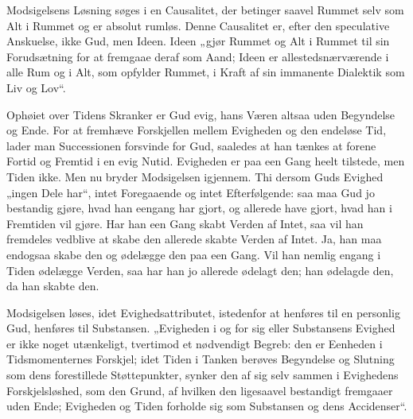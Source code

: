 \documentclass[12pt]{book}
\begin{document}
Modsigelsens Løsning søges i en Causalitet, der betinger saavel
Rummet selv som Alt i Rummet og er absolut rumløs. Denne Causalitet
er, efter den speculative Anskuelse, ikke Gud, men Ideen. Ideen
„gjør Rummet og Alt i Rummet til sin Forudsætning for at fremgaae
deraf som Aand; Ideen er allestedsnærværende i alle Rum og i Alt,
som opfylder Rummet, i Kraft af sin immanente Dialektik som Liv og
Lov“.

Ophøiet over Tidens Skranker er Gud evig, hans Væren altsaa uden
Begyndelse og Ende. For at fremhæve Forskjellen mellem Evigheden og
den endeløse Tid, lader man Successionen forsvinde for Gud,
saaledes at han tænkes at forene Fortid og Fremtid i en evig Nutid.
Evigheden er paa een Gang heelt tilstede, men
Tiden ikke. Men nu bryder Modsigelsen igjennem. Thi dersom Guds
Evighed „ingen Dele har“, intet Foregaaende og intet Efterfølgende:
saa maa Gud jo bestandig gjøre, hvad han eengang har gjort, og
allerede have gjort, hvad han i Fremtiden vil gjøre. Har han een
Gang skabt Verden af Intet, saa vil han fremdeles vedblive at skabe
den allerede skabte Verden af Intet. Ja, han maa endogsaa skabe den
og ødelægge den paa een Gang. Vil han nemlig engang i Tiden
ødelægge Verden, saa har han jo allerede ødelagt den; han ødelagde
den, da han skabte den.

Modsigelsen løses, idet Evighedsattributet, istedenfor at henføres
til en personlig Gud, henføres til Substansen. „Evigheden i og for
sig eller Substansens Evighed er ikke noget utænkeligt, tvertimod et
nødvendigt Begreb: den er Eenheden i Tidsmomenternes Forskjel; idet
Tiden i Tanken berøves Begyndelse og Slutning som dens forestillede
Støttepunkter, synker den af sig selv sammen i Evighedens
Forskjelsløshed, som den Grund, af hvilken den ligesaavel bestandigt
fremgaaer uden Ende; Evigheden og Tiden forholde sig som Substansen
og dens Accidenser“.
\end{document}
